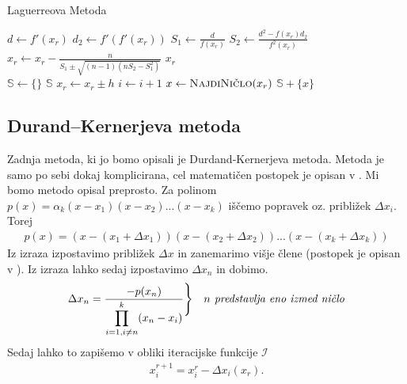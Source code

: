 \begin{algorithm}[H]
\caption{Laguerreova Metoda}
\begin{algorithmic}

 
    \State $d \gets f'(x_r)$ 
    \State $d_2 \gets f'(f'(x_r))$
    \State $S_1 \gets \frac{d}{f(x_r)}$
    \State $S_2 \gets \frac{d^2 - f(x_r)d_2}{f^2(x_r)}$
    \State $x_r \gets x_r - \frac{n}{S_1 \pm \sqrt{(n-1)(nS_2-S_1^2)}}$
\EndWhile 
\State  \Return $x_r$
\EndProcedure
\\
\State $\mathbb{S} \gets \{\}$
 
     
        \State \Return $\mathbb{S}$
    \EndIf
    \State $x_r \gets x_r \pm h$ 
    \State $i \gets i + 1$ 
    \State $x \gets \Call{NajdiNičlo}{x_r}$
     
    \State $\mathbb{S} + \{x\}$ 
    \EndIf
\EndWhile 
\EndProcedure\\

\end{algorithmic}
\end{algorithm}
\newpage
\subsection{Durand–Kernerjeva metoda}
Zadnja metoda, ki jo bomo opisali je Durdand-Kernerjeva metoda. Metoda je samo po sebi dokaj komplicirana, cel matematičen postopek je opisan v \cite{Bohte_1993}. Mi bomo metodo opisal preprosto. Za polinom $p(x) = \alpha_k (x-x_1)(x-x_2)...(x-x_k)$ iščemo popravek oz. približek $\Delta x_i$. Torej
\begin{align}
    p(x) = (x-(x_1 + \Delta x_1))(x-(x_2 + \Delta x_2))...(x-(x_k + \Delta x_k)) 
\end{align}
Iz izraza izpostavimo približek $\Delta x$ in zanemarimo višje člene (postopek je opisan v \cite{Bohte_1993, Plestenjak2010}). Iz izraza lahko sedaj izpostavimo $\Delta x_n$ in dobimo.
\begin{equation}
    \Delta x_n = \frac{-p(x_n)}{\displaystyle \prod_{i=1, i \ne n}^k (x_n - x_i)} \Bigg \rbrace \quad \text{\textit{$n$ predstavlja eno izmed ničlo}}
\end{equation}
Sedaj lahko to zapišemo v obliki iteracijske funkcije $\mathcal{I}$
\begin{align}
    x_i^{r+1} = x_i^r - \Delta x_i(x_r).
\end{align}



